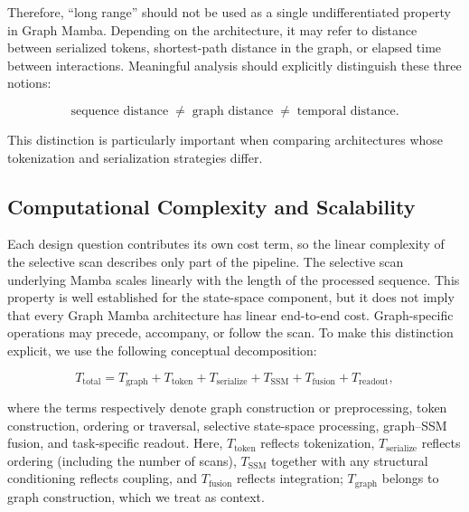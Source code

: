 \documentclass[acmsmall]{acmart}
\begin{document}
Therefore, ``long range'' should not be used as a single undifferentiated
property in Graph Mamba. Depending on the architecture, it may refer to
distance between serialized tokens, shortest-path distance in the graph, or
elapsed time between interactions. Meaningful analysis should explicitly
distinguish these three notions:

\begin{equation}
\text{sequence distance}
\;\neq\;
\text{graph distance}
\;\neq\;
\text{temporal distance}.
\label{eq:distance-distinction}
\end{equation}

This distinction is particularly important when comparing architectures whose
tokenization and serialization strategies differ.

\subsection{Computational Complexity and Scalability}
\label{subsec:complexity}

Each design question contributes its own cost term, so the linear complexity of the selective scan describes only part of the pipeline. The selective scan underlying Mamba scales linearly with the length of the
processed sequence. This property is well established for the state-space
component, but it does not imply that every Graph Mamba architecture has
linear end-to-end cost. Graph-specific operations may precede, accompany, or
follow the scan.
To make this distinction explicit, we use the following conceptual
decomposition:

\begin{equation}
T_{\mathrm{total}}
=
T_{\mathrm{graph}}
+
T_{\mathrm{token}}
+
T_{\mathrm{serialize}}
+
T_{\mathrm{SSM}}
+
T_{\mathrm{fusion}}
+
T_{\mathrm{readout}},
\label{eq:end-to-end-cost}
\end{equation}

where the terms respectively denote graph construction or preprocessing,
token construction, ordering or traversal, selective state-space processing,
graph--SSM fusion, and task-specific readout. 
Here, $T_{\mathrm{token}}$ reflects tokenization, $T_{\mathrm{serialize}}$ reflects ordering (including the number of scans), $T_{\mathrm{SSM}}$ together with any structural conditioning reflects coupling, and $T_{\mathrm{fusion}}$ reflects integration; $T_{\mathrm{graph}}$ belongs to graph construction, which we treat as context.
\end{document}
